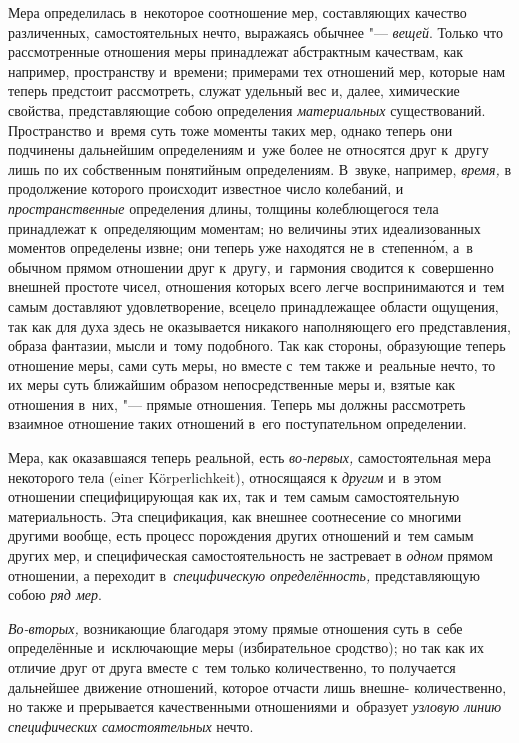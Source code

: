 Мера определилась в~некоторое соотношение мер, составляющих качество
различенных, самостоятельных нечто, выражаясь обычнее "--- {\em вещей}.
Только что рассмотренные отношения меры принадлежат абстрактным качествам, как
например, пространству и~времени; примерами тех отношений мер, которые нам
теперь предстоит рассмотреть, служат удельный вес и, далее, химические
свойства, представляющие собою определения {\em материальных} существований.
Пространство и~время суть тоже моменты таких мер, однако теперь они подчинены
дальнейшим определениям и~уже более не относятся друг к~другу лишь по их
собственным понятийным определениям. В~звуке, например, {\em время,}
в продолжение которого происходит известное число колебаний,
и {\em пространственные} определения длины, толщины колеблющегося тела
принадлежат к~определяющим моментам; но величины этих идеализованных моментов
определены извне; они теперь уже находятся не в~степенн\'{о}м, а~в обычном
прямом отношении друг к~другу, и~гармония сводится к~совершенно внешней
простоте чисел, отношения которых всего легче воспринимаются и~тем самым
доставляют удовлетворение, всецело принадлежащее области ощущения, так как для
духа здесь не оказывается никакого наполняющего его представления, образа
фантазии, мысли и~тому подобного. Так как стороны, образующие теперь отношение
меры, сами суть меры, но вместе с~тем также и~реальные нечто, то их меры суть
ближайшим образом непосредственные меры и, взятые как отношения в~них, "---
прямые отношения. Теперь мы должны рассмотреть взаимное отношение таких
отношений в~его поступательном определении.

Мера, как оказавшаяся теперь реальной, есть {\em во-первых,} самостоятельная
мера некоторого тела (einer Körper\-lich\-keit), относящаяся к {\em другим} и~в
этом отношении специфицирующая как их, так и~тем самым самостоятельную
материальность. Эта спецификация, как внешнее соотнесение со многими другими
вообще, есть процесс порождения других отношений и~тем самым других мер, и
специфическая самостоятельность не застревает в {\em одном} прямом отношении,
а переходит в~{\em специфическую определённость,} представляющую собою
{\em ряд мер}.

{\em Во-вторых,} возникающие благодаря этому прямые отношения суть в~себе
определённые и~исключающие меры (избирательное сродство); но так как их отличие
друг от друга вместе с~тем только количественно, то получается дальнейшее
движение отношений, которое отчасти лишь внешне- количественно, но также
и прерывается качественными отношениями и~образует {\em узловую линию
специфических самостоятельных} нечто.

